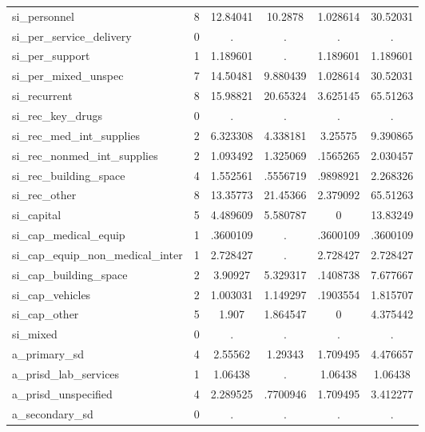 \begin{table}[htbp]
\begin{tabular}{l*{1}{ccccc}}
si\_personnel&           8&    12.84041&     10.2878&    1.028614&    30.52031\\
si\_per\_service\_delivery&           0&           .&           .&           .&           .\\
si\_per\_support&           1&    1.189601&           .&    1.189601&    1.189601\\
si\_per\_mixed\_unspec&           7&    14.50481&    9.880439&    1.028614&    30.52031\\
si\_recurrent&           8&    15.98821&    20.65324&    3.625145&    65.51263\\
si\_rec\_key\_drugs&           0&           .&           .&           .&           .\\
si\_rec\_med\_int\_supplies&           2&    6.323308&    4.338181&     3.25575&    9.390865\\
si\_rec\_nonmed\_int\_supplies&           2&    1.093492&    1.325069&    .1565265&    2.030457\\
si\_rec\_building\_space&           4&    1.552561&    .5556719&    .9898921&    2.268326\\
si\_rec\_other&           8&    13.35773&    21.45366&    2.379092&    65.51263\\
si\_capital  &           5&    4.489609&    5.580787&           0&    13.83249\\
si\_cap\_medical\_equip&           1&    .3600109&           .&    .3600109&    .3600109\\
si\_cap\_equip\_non\_medical\_inter&           1&    2.728427&           .&    2.728427&    2.728427\\
si\_cap\_building\_space&           2&     3.90927&    5.329317&    .1408738&    7.677667\\
si\_cap\_vehicles&           2&    1.003031&    1.149297&    .1903554&    1.815707\\
si\_cap\_other&           5&       1.907&    1.864547&           0&    4.375442\\
si\_mixed    &           0&           .&           .&           .&           .\\
a\_primary\_sd&           4&     2.55562&     1.29343&    1.709495&    4.476657\\
a\_prisd\_lab\_services&           1&     1.06438&           .&     1.06438&     1.06438\\
a\_prisd\_unspecified&           4&    2.289525&    .7700946&    1.709495&    3.412277\\
a\_secondary\_sd&           0&           .&           .&           .&           .\\

\end{tabular}
\end{table}
